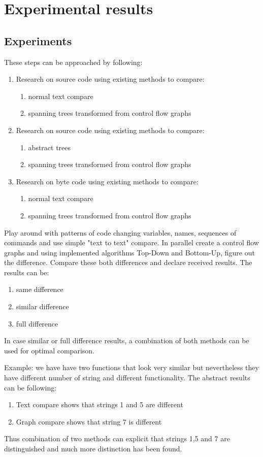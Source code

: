 \chapter{Experimental results}
\label{chap:experimental}
\section{Experiments}
These steps can be approached by following:

\begin{enumerate}
  \item Research on source code using existing methods to compare:
  	\begin{enumerate}
   	 	\item normal text compare
   		 \item spanning trees transformed from control flow graphs
	 \end{enumerate}	
  \item Research on source code using existing methods to compare:
  \begin{enumerate}
    \item abstract trees
    \item spanning trees transformed from control flow graphs
  \end{enumerate}
  \item Research on byte code using existing methods to compare:
  \begin{enumerate}
    \item normal text compare
    \item spanning trees transformed from control flow graphs
  \end{enumerate}
\end{enumerate}

	
Play around with patterns of code changing variables, names, sequences of commands and use simple "text to text" compare. In parallel create a control flow graphs and using implemented algorithms Top-Down and Bottom-Up, figure out the difference. Compare these both differences and declare received results.
The results can be: 
\begin{enumerate}
  \item same difference
  \item similar difference
  \item full difference
\end{enumerate}
In case similar or full difference results, a combination of both methods can be used for optimal comparison. 

Example: we have have two functions that look very similar but nevertheless they have different number of string and different functionality. The abstract results can be following:
\begin{enumerate}
	\item Text compare shows that strings 1 and 5 are different
	\item Graph compare shows that string 7 is different 
\end{enumerate}

Thus combination of two methods can explicit that strings 1,5 and 7 are distinguished and much more distinction has been found.
